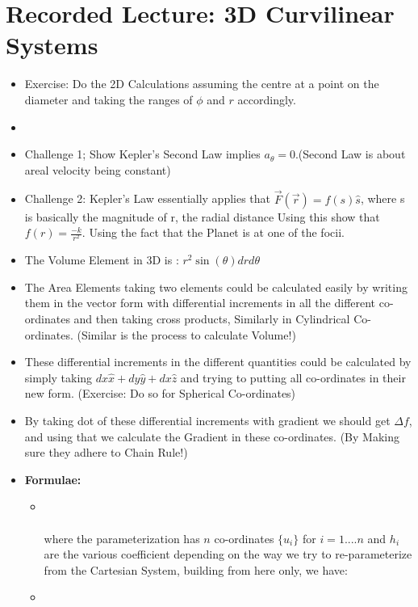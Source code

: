 \documentclass{article}
\begin{document}
\section{Recorded Lecture: 3D Curvilinear Systems}
\begin{itemize}
  \item  Exercise: Do the 2D Calculations assuming the centre at a point on the diameter and taking the ranges of $\phi$ and $r$ accordingly.
  \item {}
  \item Challenge 1; Show Kepler's Second Law implies $a_{\theta} = 0$.(Second Law is about areal velocity being constant)
  \item Challenge 2: Kepler's Law essentially applies that $\vec{F}(\vec{r}) = f(s)\hat{s}$, where s is basically the magnitude of r, the radial distance
  Using this show that $f(r) = \frac{-k}{r^{2}}$. Using the fact that the Planet is at one of the focii.
  \item The Volume Element in 3D is : $r^{2}\sin(\theta)drd\theta$
  \item The Area Elements taking two elements could be calculated easily by writing them in the vector form with differential increments in all the different co-ordinates and then taking cross products, Similarly in Cylindrical Co-ordinates. (Similar is the process to calculate Volume!)

  \item These differential increments in the different quantities could be calculated by simply taking $dx\hat{x} + dy\hat{y} + dx\hat{z}$ and trying to putting all co-ordinates in their new form. (Exercise: Do so for Spherical Co-ordinates)

  \item By taking dot of these differential increments with gradient we should get $\Delta f$, and using that we calculate the Gradient in these co-ordinates. (By Making sure they adhere to Chain Rule!)


  \item \textbf{Formulae:}

  \begin{itemize}
    \item {} \\ \\
    where the parameterization has $n$ co-ordinates $\{u_i\}$ for $i = 1....n$ and $h_i$ are the various coefficient depending on the way we try to re-parameterize from the Cartesian System, building from here only, we have:
    \item {}
  \end{itemize}

\end{itemize}
\end{document}
